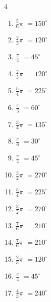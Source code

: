\begin{multicols}{4}
\begin{enumerate}
  \item $\displaystyle \frac{5}{6}\pi$
        $\displaystyle =150^{\circ}$

  \item $\displaystyle \frac{2}{3}\pi$
        $\displaystyle =120^{\circ}$

  \item $\displaystyle \frac{\pi}{4}$
        $\displaystyle =45^{\circ}$

  \item $\displaystyle \frac{2}{3}\pi$
        $\displaystyle =120^{\circ}$

  \item $\displaystyle \frac{5}{4}\pi$
        $\displaystyle =225^{\circ}$

  \item $\displaystyle \frac{\pi}{3}$
        $\displaystyle =60^{\circ}$

  \item $\displaystyle \frac{3}{4}\pi$
        $\displaystyle =135^{\circ}$

  \item $\displaystyle \frac{\pi}{6}$
        $\displaystyle =30^{\circ}$

  \item $\displaystyle \frac{\pi}{4}$
        $\displaystyle =45^{\circ}$

  \item $\displaystyle \frac{3}{2}\pi$
        $\displaystyle =270^{\circ}$

  \item $\displaystyle \frac{5}{4}\pi$
        $\displaystyle =225^{\circ}$

  \item $\displaystyle \frac{3}{2}\pi$
        $\displaystyle =270^{\circ}$

  \item $\displaystyle \frac{7}{6}\pi$
        $\displaystyle =210^{\circ}$

\columnbreak %

  \item $\displaystyle \frac{7}{6}\pi$
        $\displaystyle =210^{\circ}$

  \item $\displaystyle \frac{2}{3}\pi$
        $\displaystyle =120^{\circ}$

  \item $\displaystyle \frac{\pi}{4}$
        $\displaystyle =45^{\circ}$

  \item $\displaystyle \frac{4}{3}\pi$
        $\displaystyle =240^{\circ}$


\end{enumerate}
\end{multicols}

